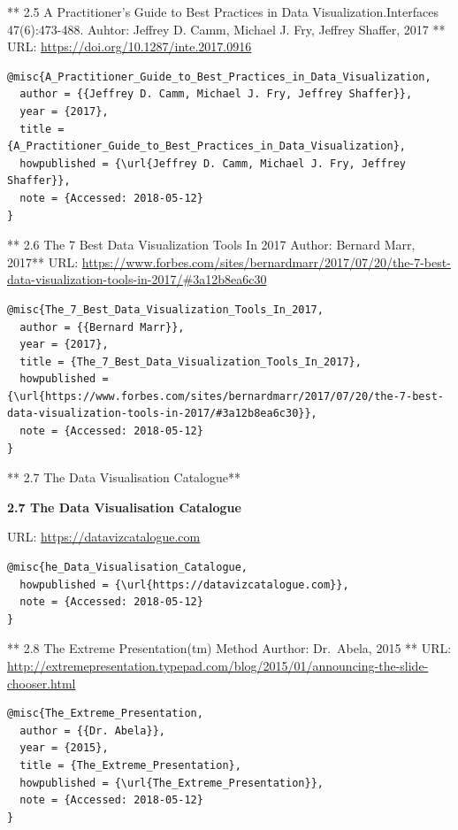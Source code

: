 \documentclass[]{book}
\theoremstyle{definition}
\theoremstyle{definition}
\theoremstyle{definition}
\theoremstyle{remark}
\begin{document}
** 2.5 A Practitioner's Guide to Best Practices in Data
Visualization.Interfaces 47(6):473-488.\textbf{ } Auhtor: Jeffrey D.
Camm, Michael J. Fry, Jeffrey Shaffer, 2017 ** URL:
\url{https://doi.org/10.1287/inte.2017.0916}

\citep{A_Practitioner_Guide_to_Best_Practices_in_Data_Visualization}

\begin{verbatim}
@misc{A_Practitioner_Guide_to_Best_Practices_in_Data_Visualization,
  author = {{Jeffrey D. Camm, Michael J. Fry, Jeffrey Shaffer}},
  year = {2017},
  title = {A_Practitioner_Guide_to_Best_Practices_in_Data_Visualization},
  howpublished = {\url{Jeffrey D. Camm, Michael J. Fry, Jeffrey Shaffer}},
  note = {Accessed: 2018-05-12}
}
\end{verbatim}

** 2.6 The 7 Best Data Visualization Tools In 2017\textbf{ } Author:
Bernard Marr, 2017** URL:
\url{https://www.forbes.com/sites/bernardmarr/2017/07/20/the-7-best-data-visualization-tools-in-2017/\#3a12b8ea6c30}

\citep{The_7_Best_Data_Visualization_Tools_In_2017}

\begin{verbatim}
@misc{The_7_Best_Data_Visualization_Tools_In_2017,
  author = {{Bernard Marr}},
  year = {2017},
  title = {The_7_Best_Data_Visualization_Tools_In_2017},
  howpublished = {\url{https://www.forbes.com/sites/bernardmarr/2017/07/20/the-7-best-data-visualization-tools-in-2017/#3a12b8ea6c30}},
  note = {Accessed: 2018-05-12}
}
\end{verbatim}

** 2.7 The Data Visualisation Catalogue**

\textbf{2.7 The Data Visualisation Catalogue}

URL: \url{https://datavizcatalogue.com}
\citep{The_Data_Visualisation_Catalogue}

\begin{verbatim}
@misc{he_Data_Visualisation_Catalogue,
  howpublished = {\url{https://datavizcatalogue.com}},
  note = {Accessed: 2018-05-12}
}
\end{verbatim}

** 2.8 The Extreme Presentation(tm) Method \textbf{ } Aurthor:
Dr.~Abela, 2015 ** URL:
\url{http://extremepresentation.typepad.com/blog/2015/01/announcing-the-slide-chooser.html}
\citep{The_Extreme_Presentation}

\begin{verbatim}
@misc{The_Extreme_Presentation,
  author = {{Dr. Abela}},
  year = {2015},
  title = {The_Extreme_Presentation},
  howpublished = {\url{The_Extreme_Presentation}},
  note = {Accessed: 2018-05-12}
}
\end{verbatim}
\end{document}

